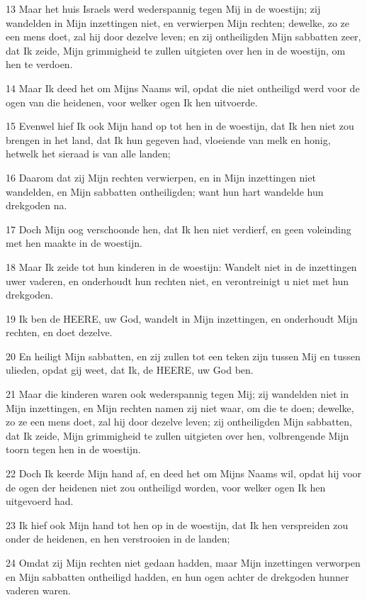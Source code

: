 \par 13 Maar het huis Israels werd wederspannig tegen Mij in de woestijn; zij wandelden in Mijn inzettingen niet, en verwierpen Mijn rechten; dewelke, zo ze een mens doet, zal hij door dezelve leven; en zij ontheiligden Mijn sabbatten zeer, dat Ik zeide, Mijn grimmigheid te zullen uitgieten over hen in de woestijn, om hen te verdoen.
\par 14 Maar Ik deed het om Mijns Naams wil, opdat die niet ontheiligd werd voor de ogen van die heidenen, voor welker ogen Ik hen uitvoerde.
\par 15 Evenwel hief Ik ook Mijn hand op tot hen in de woestijn, dat Ik hen niet zou brengen in het land, dat Ik hun gegeven had, vloeiende van melk en honig, hetwelk het sieraad is van alle landen;
\par 16 Daarom dat zij Mijn rechten verwierpen, en in Mijn inzettingen niet wandelden, en Mijn sabbatten ontheiligden; want hun hart wandelde hun drekgoden na.
\par 17 Doch Mijn oog verschoonde hen, dat Ik hen niet verdierf, en geen voleinding met hen maakte in de woestijn.
\par 18 Maar Ik zeide tot hun kinderen in de woestijn: Wandelt niet in de inzettingen uwer vaderen, en onderhoudt hun rechten niet, en verontreinigt u niet met hun drekgoden.
\par 19 Ik ben de HEERE, uw God, wandelt in Mijn inzettingen, en onderhoudt Mijn rechten, en doet dezelve.
\par 20 En heiligt Mijn sabbatten, en zij zullen tot een teken zijn tussen Mij en tussen ulieden, opdat gij weet, dat Ik, de HEERE, uw God ben.
\par 21 Maar die kinderen waren ook wederspannig tegen Mij; zij wandelden niet in Mijn inzettingen, en Mijn rechten namen zij niet waar, om die te doen; dewelke, zo ze een mens doet, zal hij door dezelve leven; zij ontheiligden Mijn sabbatten, dat Ik zeide, Mijn grimmigheid te zullen uitgieten over hen, volbrengende Mijn toorn tegen hen in de woestijn.
\par 22 Doch Ik keerde Mijn hand af, en deed het om Mijns Naams wil, opdat hij voor de ogen der heidenen niet zou ontheiligd worden, voor welker ogen Ik hen uitgevoerd had.
\par 23 Ik hief ook Mijn hand tot hen op in de woestijn, dat Ik hen verspreiden zou onder de heidenen, en hen verstrooien in de landen;
\par 24 Omdat zij Mijn rechten niet gedaan hadden, maar Mijn inzettingen verworpen en Mijn sabbatten ontheiligd hadden, en hun ogen achter de drekgoden hunner vaderen waren.
